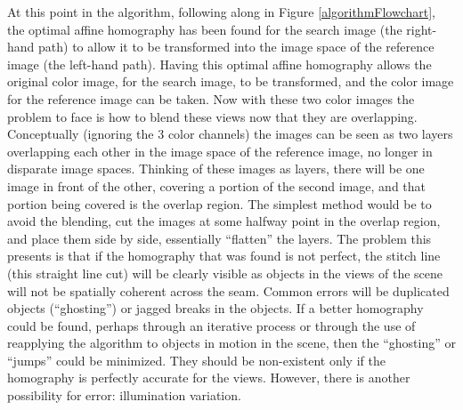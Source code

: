 %
%
%
%
%
%
%
%
%

%
%
%



At this point in the algorithm, following along in Figure \ref{algorithmFlowchart}, the optimal affine homography has been found for the search image (the right-hand path) to allow it to be transformed into the image space of the reference image (the left-hand path). Having this optimal affine homography allows the original color image, for the search image, to be transformed, and the color image for the reference image can be taken. Now with these two color images the problem to face is how to blend these views now that they are overlapping. Conceptually (ignoring the 3 color channels) the images can be seen as two layers overlapping each other in the image space of the reference image, no longer in disparate image spaces. Thinking of these images as layers, there will be one image in front of the other, covering a portion of the second image, and that portion being covered is the overlap region. The simplest method would be to avoid the blending, cut the images at some halfway point in the overlap region, and place them side by side, essentially ``flatten'' the layers. The problem this presents is that if the homography that was found is not perfect, the stitch line (this straight line cut) will be clearly visible as objects in the views of the scene will not be spatially coherent across the seam. Common errors will be duplicated objects (``ghosting'') or jagged breaks in the objects. If a better homography could be found, perhaps through an iterative process or through the use of reapplying the algorithm to objects in motion in the scene, then the ``ghosting'' or ``jumps'' could be minimized. They should be non-existent only if the homography is perfectly accurate for the views. However, there is another possibility for error: illumination variation.

